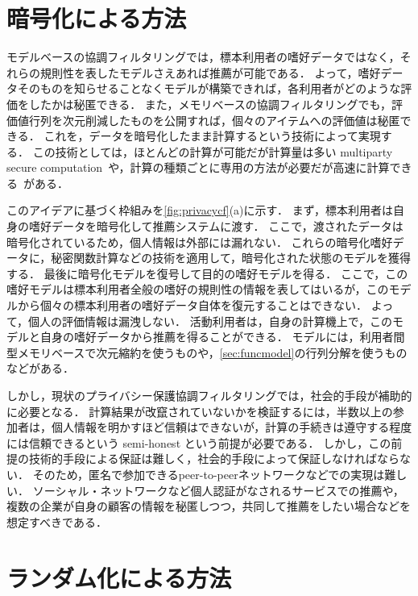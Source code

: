 \section{暗号化による方法}

モデルベースの協調フィルタリングでは，標本利用者の嗜好データではなく，それらの規則性を表したモデルさえあれば推薦が可能である．
よって，嗜好データそのものを知らせることなくモデルが構築できれば，各利用者がどのような評価をしたかは秘匿できる．
また，メモリベースの協調フィルタリングでも，評価値行列を次元削減したものを公開すれば，個々のアイテムへの評価値は秘匿できる．
これを，データを暗号化したまま計算するという技術によって実現する．
この技術としては，ほとんどの計算が可能だが計算量は多い multiparty secure computation~\cite{misc:010}や，計算の種類ごとに専用の方法が必要だが高速に計算できる~\cite{kdde:02:03}がある．

このアイデアに基づく枠組みを\ref{fig:privacycf}(a)に示す．
まず，標本利用者は自身の嗜好データを暗号化して推薦システムに渡す．
ここで，渡されたデータは暗号化されているため，個人情報は外部には漏れない．
これらの暗号化嗜好データに，秘密関数計算などの技術を適用して，暗号化された状態のモデルを獲得する．
最後に暗号化モデルを復号して目的の嗜好モデルを得る．
ここで，この嗜好モデルは標本利用者全般の嗜好の規則性の情報を表してはいるが，このモデルから個々の標本利用者の嗜好データ自体を復元することはできない．
よって，個人の評価情報は漏洩しない．
活動利用者は，自身の計算機上で，このモデルと自身の嗜好データから推薦を得ることができる．
モデルには，利用者間型メモリベースで次元縮約を使うもの\cite{ec:007}や，\ref{sec:funcmodel}の行列分解を使うもの\cite{sigir:02:01}などがある．

しかし，現状のプライバシー保護協調フィルタリングでは，社会的手段が補助的に必要となる．
計算結果が改竄されていないかを検証するには，半数以上の参加者は，個人情報を明かすほど信頼はできないが，計算の手続きは遵守する程度には信頼できるという semi-honest という前提が必要である．
しかし，この前提の技術的手段による保証は難しく，社会的手段によって保証しなければならない．
そのため，匿名で参加できるpeer-to-peerネットワークなどでの実現は難しい．
ソーシャル・ネットワークなど個人認証がなされるサービスでの推薦や，複数の企業が自身の顧客の情報を秘匿しつつ，共同して推薦をしたい場合などを想定すべきである．

\section{ランダム化による方法}

